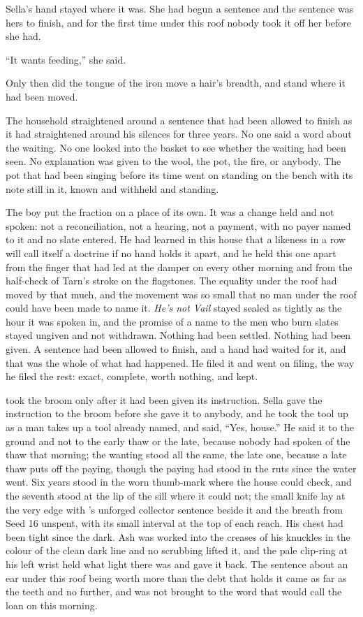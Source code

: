 Sella's hand stayed where it was. She had begun a sentence and the sentence was hers to finish, and for the first time under this roof nobody took it off her before she had.

“It wants feeding,” she said.

Only then did the tongue of the iron move a hair's breadth, and stand where it had been moved.

The household straightened around a sentence that had been allowed to finish as it had straightened around his silences for three years. No one said a word about the waiting. No one looked into the basket to see whether the waiting had been seen. No explanation was given to the wool, the pot, the fire, or anybody. The pot that had been singing before its time went on standing on the bench with its note still in it, known and withheld and standing.

The boy put the fraction on a place of its own. It was a change held and not spoken: not a reconciliation, not a hearing, not a payment, with no payer named to it and no slate entered. He had learned in this house that a likeness in a row will call itself a doctrine if no hand holds it apart, and he held this one apart from the finger that had led at the damper on every other morning and from the half-check of Tarn's stroke on the flagstones. The equality under the roof had moved by that much, and the movement was so small that no man under the roof could have been made to name it. \emph{He's not Vail} stayed sealed as tightly as the hour it was spoken in, and the promise of a name to the men who burn slates stayed ungiven and not withdrawn. Nothing had been settled. Nothing had been given. A sentence had been allowed to finish, and a hand had waited for it, and that was the whole of what had happened. He filed it and went on filing, the way he filed the rest: exact, complete, worth nothing, and kept.

\scenebreak

 took the broom only after it had been given its instruction. Sella gave the instruction to the broom before she gave it to anybody, and he took the tool up as a man takes up a tool already named, and said, “Yes, house.” He said it to the ground and not to the early thaw or the late, because nobody had spoken of the thaw that morning; the wanting stood all the same, the late one, because a late thaw puts off the paying, though the paying had stood in the ruts since the water went. Six years stood in the worn thumb-mark where the house could check, and the seventh stood at the lip of the sill where it could not; the small knife lay at the very edge with 's unforged collector sentence beside it and the breath from Seed 16 unspent, with its small interval at the top of each reach. His chest had been tight since the dark. Ash was worked into the creases of his knuckles in the colour of the clean dark line and no scrubbing lifted it, and the pale clip-ring at his left wrist held what light there was and gave it back. The sentence about an ear under this roof being worth more than the debt that holds it came as far as the teeth and no further, and was not brought to the word that would call the loan on this morning.

